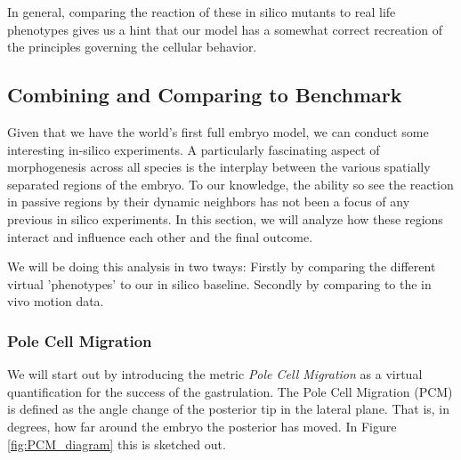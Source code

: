 In general, comparing the reaction of these in silico mutants to real life phenotypes gives us a hint that our model has a somewhat correct recreation of the principles governing the cellular behavior.






\subsection{Combining and Comparing to Benchmark}


Given that we have the world’s first full embryo model, we can conduct some interesting in-silico experiments. A particularly fascinating aspect of morphogenesis across all species is the interplay between the various spatially separated regions of the embryo. To our knowledge, the ability so see the reaction in passive regions by their dynamic neighbors has not been a focus of any previous in silico experiments.  In this section, we will analyze how these regions interact and influence each other and the final outcome.

We will be doing this analysis in two tways: Firstly by comparing the different virtual 'phenotypes' to our in silico baseline. Secondly by comparing to the in vivo motion data.  

\subsubsection{Pole Cell Migration}
We will start out by introducing the metric \textit{Pole Cell Migration} as a virtual quantification for the success of the gastrulation. The Pole Cell Migration (PCM) is defined as the angle change of the posterior tip in the lateral plane. That is, in degrees, how far around the embryo the posterior has moved. In Figure \ref{fig:PCM_diagram} this is sketched out.  \\


